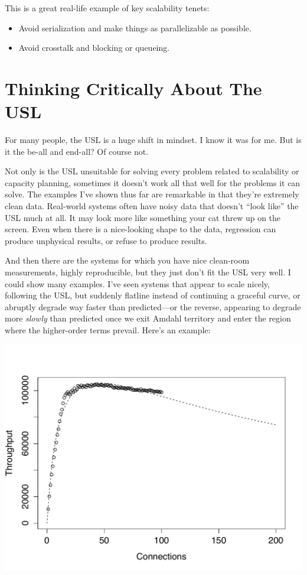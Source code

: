\documentclass{vivid_layout}
\begin{document}
This is a great real-life example of key scalability tenets:

\begin{itemize}
\item Avoid serialization and make things as parallelizable as possible.
\item Avoid crosstalk and blocking or queueing.
\end{itemize}

\section{Thinking Critically About The USL}

For many people, the USL is a huge shift in mindset. I know it was for me. But
is it the be-all and end-all? Of course not.

Not only is the USL unsuitable for solving every problem related to scalability
or capacity planning, sometimes it doesn't work all that well for the problems
it can solve. The examples I've shown thus far are remarkable in that they're
extremely clean data. Real-world systems often have noisy data that doesn't
``look like'' the USL much at all. It may look more like something your cat
threw up on the screen. Even when there is a nice-looking shape to the data,
regression can produce unphysical results, or refuse to produce results.

And then there are the systems for which you have nice clean-room measurements,
highly reproducible, but they just don't fit the USL very well. I could show
many examples. I've seen systems that appear to scale nicely, following the USL,
but suddenly flatline instead of continuing a graceful curve, or abruptly
degrade way faster than predicted---or the reverse, appearing to degrade more
{\itshape slowly} than predicted once we exit Amdahl territory and enter the
region where the higher-order terms prevail.  Here's an example:
\begin{center}
\includegraphics[width=.85\linewidth]{scalability/handlersocket}
\end{center}
\end{document}

